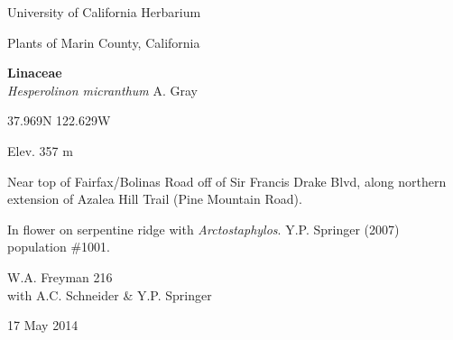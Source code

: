 \documentclass[letterpaper,10pt]{article}
\begin{document}
\begin{minipage}[t]{0.40\textwidth}

\begin{center}
University of California Herbarium \\
\begin{large}
Plants of Marin County, California \\
\end{large}
\vspace{\baselineskip}
\textbf{Linaceae} \\
\textit{Hesperolinon micranthum} A. Gray\\
\end{center}

\begin{footnotesize}

\begin{multicols}{2}
37.969\textdegree N 122.629\textdegree W
\columnbreak
\begin{flushright}
Elev. 357 m
\end{flushright}
\end{multicols}

Near top of Fairfax/Bolinas Road off of Sir Francis Drake Blvd, along northern extension of Azalea Hill Trail (Pine Mountain Road).
\vspace{\baselineskip}

In flower on serpentine ridge with \textit{Arctostaphylos}. Y.P. Springer (2007) population \#1001.

\begin{multicols}{2}
W.A. Freyman 216 \\
with A.C. Schneider \& Y.P. Springer
\columnbreak
\begin{flushright}
17 May 2014
\end{flushright}
\end{multicols}

\end{footnotesize}

\end{minipage}
%
\hspace{2cm}
%
\end{document}
